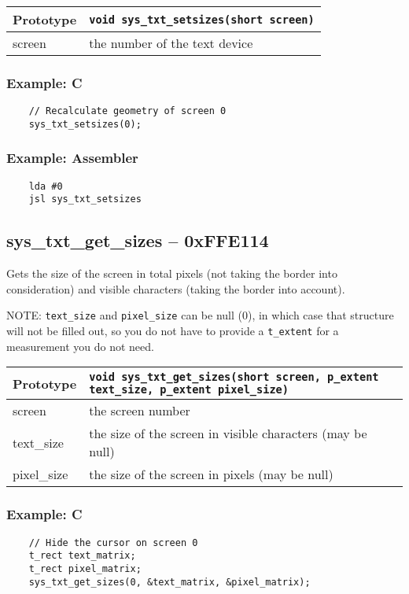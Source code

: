 \bigskip

\begin{tabular}{|l||l|} \hline
Prototype & \lstinline!void sys_txt_setsizes(short screen)! \\ \hline
screen & the number of the text device \\ \hline
\end{tabular}

\subsubsection*{Example: C}
\begin{lstlisting}
    // Recalculate geometry of screen 0
    sys_txt_setsizes(0);
\end{lstlisting}

\subsubsection*{Example: Assembler}
\begin{verbatim}
    lda #0
    jsl sys_txt_setsizes
\end{verbatim}

\subsection*{sys\_txt\_get\_sizes -- 0xFFE114}
Gets the size of the screen in total pixels (not taking the border into consideration) and visible characters (taking the border into account).

NOTE: \verb+text_size+ and \verb+pixel_size+ can be null (0), in which case that structure will not be filled out, so you do not have to provide a \verb+t_extent+ for a measurement you do not need.

\begin{tabular}{|l||l|} \hline
Prototype & \lstinline!void sys_txt_get_sizes(short screen, p_extent text_size, p_extent pixel_size)! \\ \hline
screen & the screen number  \\ \hline
text\_size & the size of the screen in visible characters (may be null) \\ \hline
pixel\_size & the size of the screen in pixels (may be null) \\ \hline
\end{tabular}

\subsubsection*{Example: C}
\begin{lstlisting}
    // Hide the cursor on screen 0
    t_rect text_matrix;
    t_rect pixel_matrix;
    sys_txt_get_sizes(0, &text_matrix, &pixel_matrix);    
\end{lstlisting}


